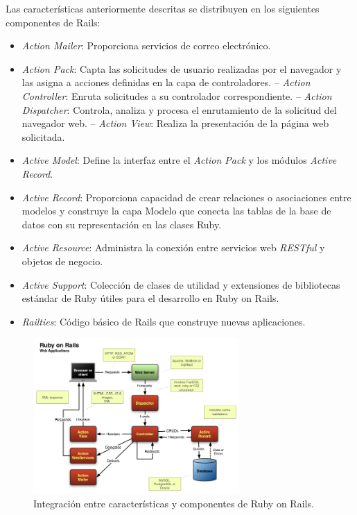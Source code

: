 Las características anteriormente descritas se distribuyen en los siguientes componentes de Rails:
\begin{itemize}
\item \textit{Action Mailer}: Proporciona servicios de correo electrónico. 
\item \textit{Action Pack}: Capta las solicitudes de usuario realizadas por el navegador y las asigna a acciones definidas en la capa de controladores.
\subitem-- \textit{Action Controller}: Enruta solicitudes a su controlador correspondiente. 
\subitem-- \textit{Action Dispatcher}: Controla, analiza y procesa el enrutamiento de la solicitud del navegador web.
\subitem-- \textit{Action View}: Realiza la presentación de la página web solicitada.
\item \textit{Active Model}: Define la interfaz entre el \textit{Action Pack} y los módulos \textit{Active Record}.
\item \textit{Active Record}: Proporciona capacidad de crear relaciones o asociaciones entre modelos y construye la capa Modelo que conecta las tablas de la base de datos con su representación en las clases Ruby.
\item \textit{Active Resource}: Administra la conexión entre servicios web \textit{RESTful} y objetos de negocio.
\item \textit{Active Support}: Colección de clases de utilidad y extensiones de bibliotecas estándar de Ruby útiles para el desarrollo en Ruby on Rails.
\item \textit{Railties}: Código básico de Rails que construye nuevas aplicaciones. 
\end{itemize}	 

\begin{figure}[H]
\centering
\includegraphics[width=0.7\textwidth]{images/figures/rubyonrails.png}
\caption{Integración entre características y componentes de Ruby on Rails.\label{fig:figure_placement_example}}
\end{figure}

